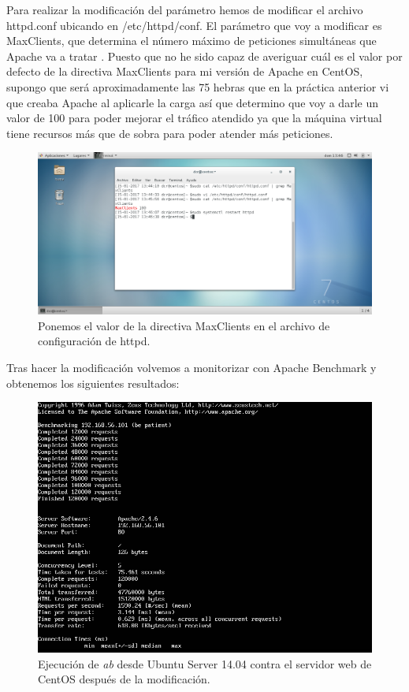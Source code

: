 Para realizar la modificación del parámetro hemos de modificar el archivo httpd.conf ubicando en /etc/httpd/conf. El parámetro que voy a modificar es MaxClients, que determina el número máximo de peticiones simultáneas que Apache va a tratar \cite{c6}. Puesto que no he sido capaz de averiguar cuál es el valor por defecto de la directiva MaxClients para mi versión de Apache en CentOS, supongo que será aproximadamente las 75 hebras que en la práctica anterior vi que creaba Apache al aplicarle la carga así que determino que voy a darle un valor de 100 para poder mejorar el tráfico atendido ya que la máquina virtual tiene recursos más que de sobra para poder atender más peticiones.

\begin{figure}[H]
\centering
\includegraphics[scale=0.6]{modifyParameter.png}
\caption{Ponemos el valor de la directiva MaxClients en el archivo de configuración de httpd.}
\end{figure}

Tras hacer la modificación volvemos a monitorizar con Apache Benchmark y obtenemos los siguientes resultados:

\begin{figure}[H]
	\centering
	\includegraphics[scale=0.6]{abPosterior1.png}
	\caption{Ejecución de \textit{ab} desde Ubuntu Server 14.04 contra el servidor web de CentOS después de la modificación.}
\end{figure}

